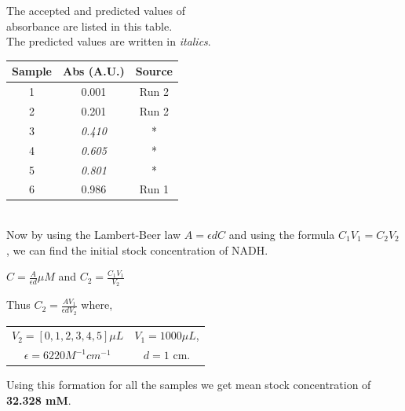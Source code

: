\documentclass[a4paper,10pt]{article}
\begin{document}
            \begin{minipage}{0.49\textwidth}
                \vspace{-7em}
                The accepted and predicted values of\\ absorbance are listed in this table.\\
                The predicted values are written in {\it italics}.\\
                
                \begin{tabular}{| c | c | c |}
                    \hline 
                    {\bfseries Sample} & {\bfseries Abs (A.U.)} & {\bfseries Source} \\
                    \hline 
                    \hline 
                    1 & 0.001 & Run 2 \\
                    2 & 0.201 & Run 2 \\
                    3 & {\it 0.410} & * \\
                    4 & {\it 0.605} & * \\
                    5 & {\it 0.801} & * \\
                    6 & 0.986 & Run 1 \\
                    \hline
                \end{tabular}
            \end{minipage}\\

            Now by using the Lambert-Beer law $A = \epsilon d C$ and using the formula
            $C_1 V_1 = C_2 V_2$, we can find the initial stock concentration of NADH.
            \begin{center}
                $ C = \frac{A}{\epsilon d} \mu M$ and $ C_2 = \frac{C_1 V_1}{V_2} $
                \vspace{0.5em}
                
                Thus $ C_2 = \frac{A V_1}{\epsilon d V_2}$ where,\\
                \vspace{0.5em}

                \begin{tabular}{c c}
                    $ V_2 = [0,1,2,3,4,5] \mu L $ & $ V_1 = 1000 \mu L $, \\
                    $\epsilon = 6220 M^{-1} cm^{-1}$ & $d = 1$ cm.\\
                \end{tabular}
            \end{center}

            Using this formation for all the samples we get mean stock concentration of 
            {\bfseries 32.328 mM}.
    \pagebreak
\end{document}
